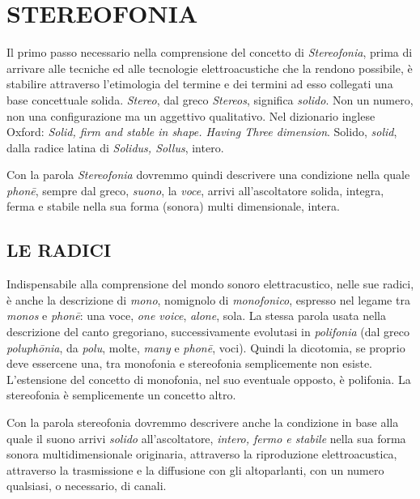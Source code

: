
\chapter{STEREOFONIA}
\startcontents[chapters]

\vfill\null

Il primo passo necessario nella comprensione del concetto di \emph{Stereofonia},
prima di arrivare alle tecniche ed alle tecnologie elettroacustiche che la
rendono possibile, è stabilire attraverso l'etimologia del termine e dei
termini ad esso collegati una base concettuale solida. \emph{Stereo}, dal greco
\emph{Stereos}, significa \emph{solido}. Non un numero, non una configurazione
ma un aggettivo qualitativo. Nel dizionario inglese Oxford: \emph{Solid, firm
and stable in shape. Having Three dimension}. Solido, \emph{solid}, dalla radice
latina di \emph{Solidus, Sollus}, intero.

Con la parola \emph{Stereofonia} dovremmo quindi descrivere una condizione
nella quale \emph{phon\={e}}, sempre dal greco, \emph{suono}, la \emph{voce},
arrivi all'ascoltatore solida, integra, ferma e stabile nella sua forma (sonora)
multi dimensionale, intera.

\clearpage

\section{LE RADICI}

Indispensabile alla comprensione del mondo sonoro elettracustico, nelle sue
radici, è anche la descrizione di \emph{mono}, nomignolo di \emph{monofonico},
espresso nel legame tra \emph{monos} e \emph{phon\={e}}: una voce,
\emph{one voice}, \emph{alone}, sola. La stessa parola usata nella descrizione
del canto gregoriano, successivamente evolutasi in \emph{polifonia} (dal greco
\emph{poluph\={o}nia}, da \emph{polu}, molte, \emph{many} e \emph{phon\={e}},
voci). Quindi la dicotomia, se proprio deve essercene una, tra monofonia e
stereofonia semplicemente non esiste. L'estensione del concetto di monofonia,
nel suo eventuale opposto, è polifonia. La stereofonia è semplicemente un
concetto altro.

Con la parola stereofonia dovremmo descrivere anche la condizione in base alla
quale il suono arrivi \emph{solido} all'ascoltatore, \emph{intero, fermo e
stabile} nella sua forma sonora multidimensionale originaria, attraverso
la riproduzione elettroacustica, attraverso la trasmissione e la diffusione con
gli altoparlanti, con un numero qualsiasi, o necessario, di canali.

